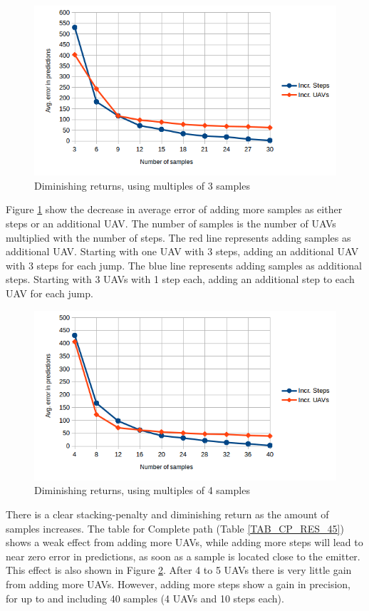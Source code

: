 \documentclass[10pt,a4paper]{book}
\begin{document}
\begin{figure}[H]
\centering
\includegraphics[width=120mm]{diminishingreturns/3mult.png}
\caption{Diminishing returns, using multiples of 3 samples}
\label{dimret3}
\end{figure}

Figure \ref{dimret3} show the decrease in average error of adding more samples as either steps or an additional \gls{UAV}. The number of samples is the number of \glspl{UAV} multiplied with the number of steps. The red line represents adding samples as additional \gls{UAV}. Starting with one \gls{UAV} with 3 steps, adding an additional \gls{UAV} with 3 steps for each jump. The blue line represents adding samples as additional steps. Starting with 3 \glspl{UAV} with 1 step each, adding an additional step to each \gls{UAV} for each jump.

\begin{figure}[H]
\centering
\includegraphics[width=120mm]{diminishingreturns/4mult.png}
\caption{Diminishing returns, using multiples of 4 samples}
\label{dimret4}
\end{figure}


There is a clear stacking-penalty and diminishing return as the amount of samples increases. The table for Complete path (Table \ref{TAB_CP_RES_45}) shows a weak effect from adding more \glspl{UAV}, while adding more steps will lead to near zero error in predictions, as soon as a sample is located close to the emitter. This effect is also shown in Figure \ref{dimret4}. After 4 to 5 \glspl{UAV} there is very little gain from adding more \glspl{UAV}. However, adding more steps show a gain in precision, for up to and including 40 samples (4 \glspl{UAV} and 10 steps each).
 
\end{document}
